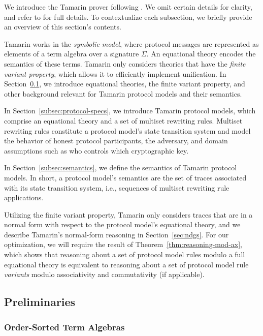 We introduce the Tamarin prover following \cite{TamarinThesisInduction}.
We omit certain details for clarity, and refer to \cite{TamarinThesisInduction} for full details.
To contextualize each subsection, we briefly provide an overview of this section's contents.

Tamarin works in the \emph{symbolic model}, where protocol messages are represented as elements of a term algebra over a signature $\Sigma$.
An equational theory encodes the semantics of these terms.
Tamarin only considers theories that have the \emph{finite variant property}, which allows it to efficiently implement unification.
In Section~\ref{sec:preliminaries}, we introduce equational theories, the finite variant property, and other background relevant for Tamarin protocol models and their semantics.

In Section~\ref{subsec:protocol-specs}, we introduce Tamarin protocol models, which comprise an equational theory and a set of multiset rewriting rules.
Multiset rewriting rules constitute a protocol model's state transition system and model the behavior of honest protocol participants, the adversary, and domain assumptions such as who controls which cryptographic key.

In Section~\ref{subsec:semantics}, we define the semantics of Tamarin protocol models.
In short, a protocol model's semantics are the set of traces associated with its state transition system, i.e., sequences of multiset rewriting rule applications.

Utilizing the finite variant property, Tamarin only considers traces that are in a normal form with respect to the protocol model's equational theory, and we describe Tamarin's normal-form reasoning in Section~\ref{sec:ndgs}.
For our optimization, we will require the result of Theorem~\ref{thm:reasoning-mod-ax}, which shows that reasoning about a set of protocol model rules modulo a full equational theory is equivalent to reasoning about a set of protocol model rule \emph{variants} modulo associativity and commutativity (if applicable).

\subsection{Preliminaries}
\label{sec:preliminaries}

\subsubsection{Order-Sorted Term Algebras}

